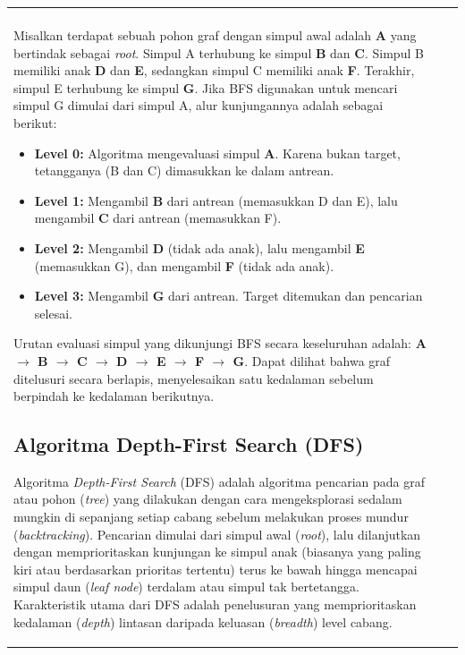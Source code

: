 \documentclass[12pt]{article}
\begin{document}
\begin{table}[H]
\begin{tabular}{|l|c|c|}
\begin{document}
\vspace{0.3cm}
\noindent\textbf{Contoh Penelusuran BFS pada Graf:} \\
Misalkan terdapat sebuah pohon graf dengan simpul awal adalah \textbf{A} yang bertindak sebagai \textit{root}. Simpul A terhubung ke simpul \textbf{B} dan \textbf{C}. Simpul B memiliki anak \textbf{D} dan \textbf{E}, sedangkan simpul C memiliki anak \textbf{F}. Terakhir, simpul E terhubung ke simpul \textbf{G}. Jika BFS digunakan untuk mencari simpul G dimulai dari simpul A, alur kunjungannya adalah sebagai berikut:
\begin{itemize}
    \item \textbf{Level 0:} Algoritma mengevaluasi simpul \textbf{A}. Karena bukan target, tetangganya (B dan C) dimasukkan ke dalam antrean.
    \item \textbf{Level 1:} Mengambil \textbf{B} dari antrean (memasukkan D dan E), lalu mengambil \textbf{C} dari antrean (memasukkan F).
    \item \textbf{Level 2:} Mengambil \textbf{D} (tidak ada anak), lalu mengambil \textbf{E} (memasukkan G), dan mengambil \textbf{F} (tidak ada anak).
    \item \textbf{Level 3:} Mengambil \textbf{G} dari antrean. Target ditemukan dan pencarian selesai.
\end{itemize}
Urutan evaluasi simpul yang dikunjungi BFS secara keseluruhan adalah: \textbf{A $\rightarrow$ B $\rightarrow$ C $\rightarrow$ D $\rightarrow$ E $\rightarrow$ F $\rightarrow$ G}. Dapat dilihat bahwa graf ditelusuri secara berlapis, menyelesaikan satu kedalaman sebelum berpindah ke kedalaman berikutnya.

\subsection{Algoritma Depth-First Search (DFS)}

Algoritma \textit{Depth-First Search} (DFS) adalah algoritma pencarian pada graf atau pohon (\textit{tree}) yang dilakukan dengan cara mengeksplorasi sedalam mungkin di sepanjang setiap cabang sebelum melakukan proses mundur (\textit{backtracking}). Pencarian dimulai dari simpul awal (\textit{root}), lalu dilanjutkan dengan memprioritaskan kunjungan ke simpul anak (biasanya yang paling kiri atau berdasarkan prioritas tertentu) terus ke bawah hingga mencapai simpul daun (\textit{leaf node}) terdalam atau simpul tak bertetangga. Karakteristik utama dari DFS adalah penelusuran yang memprioritaskan kedalaman (\textit{depth}) lintasan daripada keluasan (\textit{breadth}) level cabang.


\end{document}
\end{tabular}
\end{table}
\end{document}
